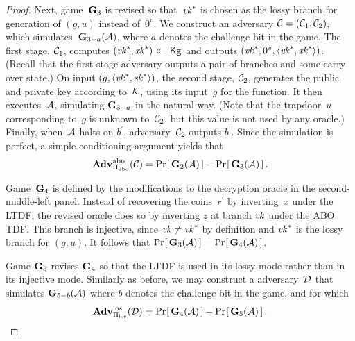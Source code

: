 \begin{proof}
  Next, game~$\mathbf{G}_3$ is revised so that~$\mathit{vk}^*$ is chosen as the lossy branch for
  generation of $(g,u)$ instead of~$0^v$. We construct an \abo adversary $\mathcal{C}
  = (\mathcal{C}_1, \mathcal{C}_2)$, which simulates~$\mathbf{G}_{3-a}(\mathcal{A})$, where $a$ denotes
  the challenge bit in the \abo game.
  The first stage, $\mathcal{C}_1$, computes $(\mathit{vk}^*,\mathit{xk}^*) \mathrel{\leftarrow\mkern-14mu\leftarrow} \mathsf{Kg}$ and outputs
  $(\mathit{vk}^*, 0^v, \langle \mathit{vk}^*,\mathit{xk}^* \rangle)$. (Recall that the first stage \abo adversary
  outputs a pair of branches and some carry-over state.)
  On input $(g, \langle \mathit{vk}^*,\mathit{sk}^* \rangle)$, the second stage, $\mathcal{C}_2$, generates
  the public and private key according to~$\mathcal{K}$, using its input~$g$ for the
  \abo function.
  It then executes~$\mathcal{A}$, simulating $\mathbf{G}_{3-a}$ in the natural way. (Note that
  the trapdoor~$u$ corresponding to~$g$ is unknown to~$\mathcal{C}_2$, but this value
  is not used by any oracle.)
  Finally, when~$\mathcal{A}$ halts on $b^\prime$, adversary~$\mathcal{C}_2$ outputs
  $b^\prime$.
  Since the simulation is perfect, a simple conditioning argument yields that
  \begin{eqnarray}
    \Adv{\abo}_{\tdfscheme_\abo}(\advC)=
    \prob{\G_2(\advA)} - \prob{\G_3(\advA)} \,.
  \end{eqnarray}

  Game~$\mathbf{G}_4$ is defined by the modifications to the decryption oracle in the
  second-middle-left panel. Instead of recovering the coins~$r^\prime$ by inverting~$x$
  under the LTDF, the revised oracle does so by inverting $z$ at branch $\mathit{vk}$
  under the ABO TDF. This branch is injective, since $\mathit{vk} \ne \mathit{vk}^*$ by definition
  and $\mathit{vk}^*$ is the lossy branch for $(g,u)$. It follows that ${\Pr\hspace{-1pt}\left[\,{\mathbf{G}_3(\mathcal{A})}\,\right]}
  = {\Pr\hspace{-1pt}\left[\,{\mathbf{G}_4(\mathcal{A})}\,\right]}$.

  Game $\mathbf{G}_5$ revises $\mathbf{G}_4$ so that the LTDF is used in its lossy mode
  rather than in its injective mode. Similarly as before, we may construct a
  \los adversary~$\mathcal{D}$ that simulates $\mathbf{G}_{5-b}(\mathcal{A})$ where $b$ denotes the
  challenge bit in the \los game, and for which
  \begin{eqnarray}
    \Adv{\los}_{\tdfscheme_\los}(\advD)=
    \prob{\G_4(\advA)} - \prob{\G_5(\advA)} \,.
  \end{eqnarray}


\end{proof}
